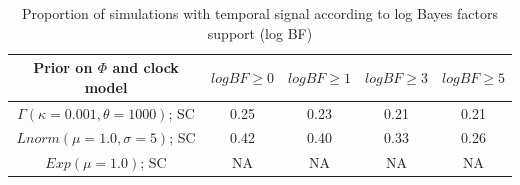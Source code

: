 \documentclass[11pt]{article}
\begin{document}
\begin{table}[H]
\caption{Proportion of simulations with temporal signal according to log Bayes factors support (log BF)}
\begin{center} 
	\label{table:logBF_pp_correspondence}
	\begin{tabular}{c|c|c|c|c}
		Prior on $\Phi$ and clock model & $log BF\ge0$ & $log BF\ge1$ & $log BF\ge3$ & $log BF\ge5$\\
		\hline
		$\Gamma(\kappa=0.001, \theta=1000)$; SC & 0.25 & 0.23 & 0.21 & 0.21 \\
		$Lnorm(\mu=1.0, \sigma=5)$; SC & 0.42 & 0.40 & 0.33 & 0.26 \\
		$Exp(\mu=1.0)$; SC & NA & NA & NA & NA \\
	\end{tabular}
\end{center}	\vspace{-0.4cm}
\end{table}
\end{document}

